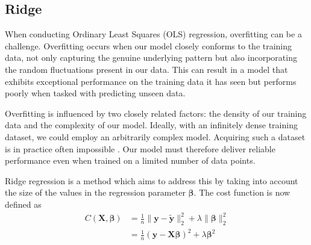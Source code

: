 \documentclass{article}
\begin{document}
\subsection{Ridge}
When conducting Ordinary Least Squares (OLS) regression, overfitting can be a challenge. Overfitting occurs when our model closely conforms to the training data, not only capturing the genuine underlying pattern but also incorporating the random fluctuations present in our data. This can result in a model that exhibits exceptional performance on the training data it has seen but performs poorly when tasked with predicting unseen data.

Overfitting is influenced by two closely related factors: the density of our training data and the complexity of our model. Ideally, with an infinitely dense training dataset, we could employ an arbitrarily complex model. Acquiring such a dataset is in practice often impossible%
. Our model must therefore deliver reliable performance even when trained on a limited number of data points.


Ridge regression is a method which aims to address this by taking into account the size of the values in the regression parameter $\boldsymbol{\beta}$. The cost function is now defined as
\begin{align*}
    C \left( \textbf{X}, \boldsymbol{\beta} \right) &= \frac{1}{n} \lVert\boldsymbol{y} - \boldsymbol{\tilde{y}} \rVert_2^2 + \lambda \lVert \boldsymbol{\beta} \rVert_2^2 \\
    &= \frac{1}{n} \left( \boldsymbol{y} - \textbf{X} \boldsymbol{\beta} \right)^2 + \lambda \boldsymbol{\beta}^2
\end{align*}

\end{document}
